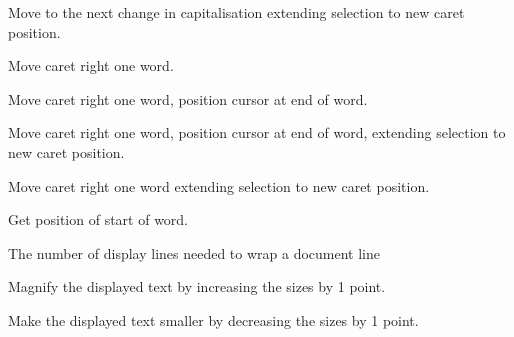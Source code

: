 \label{wxstyledtextctrlwordpartrightextend}


Move to the next change in capitalisation extending selection
to new caret position.


\label{wxstyledtextctrlwordright}


Move caret right one word.


\label{wxstyledtextctrlwordrightend}


Move caret right one word, position cursor at end of word.


\label{wxstyledtextctrlwordrightendextend}


Move caret right one word, position cursor at end of word, extending selection to new caret position.


\label{wxstyledtextctrlwordrightextend}


Move caret right one word extending selection to new caret position.


\label{wxstyledtextctrlwordstartposition}


Get position of start of word.


\label{wxstyledtextctrlwrapcount}


The number of display lines needed to wrap a document line


\label{wxstyledtextctrlzoomin}


Magnify the displayed text by increasing the sizes by 1 point.


\label{wxstyledtextctrlzoomout}


Make the displayed text smaller by decreasing the sizes by 1 point.

